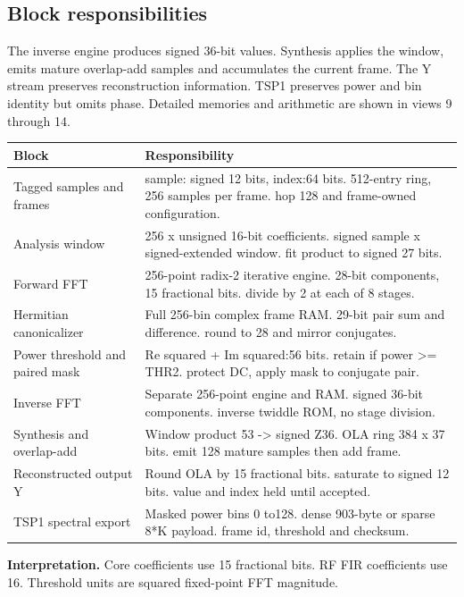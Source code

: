 \documentclass[11pt,letterpaper]{article}
\begin{document}
\subsection*{Block responsibilities}
The inverse engine produces signed 36-bit values. Synthesis applies the window, emits mature overlap-add samples and accumulates the current frame. The Y stream preserves reconstruction information. TSP1 preserves power and bin identity but omits phase. Detailed memories and arithmetic are shown in views 9 through 14.
\par\medskip\noindent
\begin{tabularx}{\linewidth}{@{}>{\raggedright\arraybackslash}p{1.65in}Y@{}}\toprule
\textbf{Block} & \textbf{Responsibility} \\ \midrule
Tagged samples and frames & sample: signed 12 bits, index:64 bits. 512-entry ring, 256 samples per frame. hop 128 and frame-owned configuration. \\[5pt]
Analysis window & 256 x unsigned 16-bit coefficients. signed sample x signed-extended window. fit product to signed 27 bits. \\[5pt]
Forward FFT & 256-point radix-2 iterative engine. 28-bit components, 15 fractional bits. divide by 2 at each of 8 stages. \\[5pt]
Hermitian canonicalizer & Full 256-bin complex frame RAM. 29-bit pair sum and difference. round to 28 and mirror conjugates. \\[5pt]
Power threshold and paired mask & Re squared + Im squared:56 bits. retain if power >= THR2. protect DC, apply mask to conjugate pair. \\[5pt]
Inverse FFT & Separate 256-point engine and RAM. signed 36-bit components. inverse twiddle ROM, no stage division. \\[5pt]
Synthesis and overlap-add & Window product 53 -> signed Z36. OLA ring 384 x 37 bits. emit 128 mature samples then add frame. \\[5pt]
Reconstructed output Y & Round OLA by 15 fractional bits. saturate to signed 12 bits. value and index held until accepted. \\[5pt]
TSP1 spectral export & Masked power bins 0 to128. dense 903-byte or sparse 8*K payload. frame id, threshold and checksum. \\[5pt]
\bottomrule\end{tabularx}
\vspace{8pt}
\noindent\textbf{Interpretation.} Core coefficients use 15 fractional bits. RF FIR coefficients use 16. Threshold units are squared fixed-point FFT magnitude.
\clearpage
\end{document}
